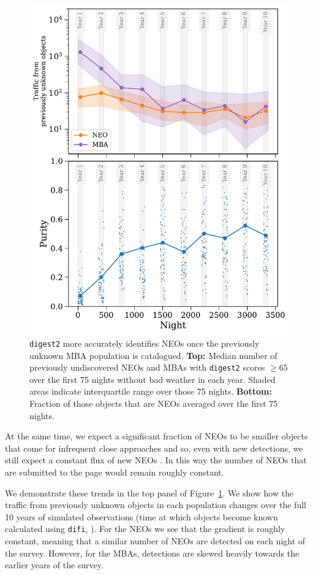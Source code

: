 \documentclass[twocolumn]{aastex631}
\newcommand{\dig}{\texttt{digest2}}
\begin{document}
\begin{figure}[htb]
    \centering
    \includegraphics[width=\columnwidth]{figures/digest2_purity_over_lsst.pdf}
    \caption{\dig{} more accurately identifies NEOs once the previously unknown MBA population is catalogued. \textbf{Top:} Median number of previously undiscovered NEOs and MBAs with \dig{} scores $\ge 65$ over the first 75 nights without bad weather in each year. Shaded areas indicate interquartile range over those 75 nights. \textbf{Bottom:} Fraction of those objects that are NEOs averaged over the first 75 nights.}
    \label{fig:digest2_purity_improvements}
\end{figure}

At the same time, we expect a significant fraction of NEOs to be smaller objects that come for infrequent close approaches and so, even with new detections, we still expect a constant flux of new NEOs \citep{Juric+2020}. In this way the number of NEOs that are submitted to the page would remain roughly constant.

We demonstrate these trends in the top panel of Figure~\ref{fig:digest2_purity_improvements}. We show how the traffic from previously unknown objects in each population changes over the full 10 years of simulated observations (time at which objects become known calculated using \texttt{difi}, \citealp{difi}). For the NEOs we see that the gradient is roughly constant, meaning that a similar number of NEOs are detected on each night of the survey. However, for the MBAs, detections are skewed heavily towards the earlier years of the survey.
\end{document}
